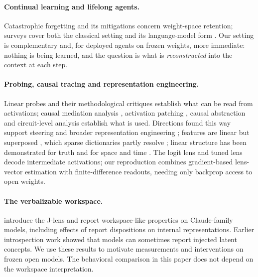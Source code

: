 \documentclass[11pt]{article}
\newcommand{\jlens}{J\mbox{-}lens}
\begin{document}
\paragraph{Continual learning and lifelong agents.} Catastrophic forgetting \citep{french1999catastrophic} and its mitigations \citep{kirkpatrick2017ewc} concern weight-space retention; surveys cover both the classical setting \citep{parisi2019continual} and its language-model form \citep{wang2024continualsurvey}. Our setting is complementary and, for deployed agents on frozen weights, more immediate: nothing is being learned, and the question is what is \emph{reconstructed} into the context at each step.

\paragraph{Probing, causal tracing and representation engineering.} Linear probes \citep{alain2017probes} and their methodological critiques \citep{hewitt2019control,belinkov2022probing} establish what can be read from activations; causal mediation analysis \citep{vig2020causal}, activation patching \citep{meng2022rome}, causal abstraction \citep{geiger2021causal} and circuit-level analysis \citep{wang2023ioi} establish what is used. Directions found this way support steering \citep{turner2023,rimsky2024,li2023iti} and broader representation engineering \citep{zou2023repe}; features are linear but superposed \citep{elhage2022}, which sparse dictionaries partly resolve \citep{bricken2023monosemanticity,templeton2024scaling}; linear structure has been demonstrated for truth \citep{marks2024geometry} and for space and time \citep{gurnee2024space}. The logit lens \citep{nostalgebraist2020} and tuned lens \citep{belrose2023} decode intermediate activations; our reproduction combines gradient-based lens-vector estimation with finite-difference readouts, needing only backprop access to open weights.

\paragraph{The verbalizable workspace.} \citet{gurnee2026} introduce the \jlens{} and report workspace-like properties on Claude-family models, including effects of report dispositions on internal representations. Earlier introspection work \citep{lindsey2025} showed that models can sometimes report injected latent concepts. We use these results to motivate measurements and interventions on frozen open models. The behavioral comparison in this paper does not depend on the workspace interpretation.
\end{document}
